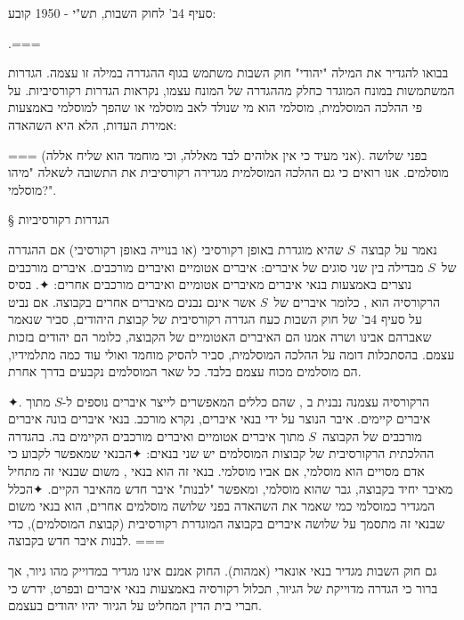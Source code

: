 סעיף 4ב' לחוק השבות, תש"י - 1950 קובע:

.===

בבואו להגדיר את המילה "יהודי" חוק השבות משתמש בגוף ההגדרה במילה זו עצמה.
הגדרות המשתמשות במונח המוגדר כחלק מההגדרה של המונח עצמו, נקראות הגדרות
רקורסיביות. על פי ההלכה המוסלמית, מוסלמי הוא מי שנולד לאב מוסלמי או שהפך
למוסלמי באמצעות אמירת העדות, הלא היא השהאדה:
\begin{Arabic}
\end{Arabic}
===
(אני מעיד כי אין אלוהים לבד מאללה, וכי מוחמד הוא שליח אללה). בפני שלושה
מוסלמים. אנו רואים כי גם ההלכה המוסלמית מגדירה רקורסיבית את התשובה לשאלה "מיהו
מוסלמי?".

§ הגדרות רקורסיביות

נאמר על קבוצה~$S$ שהיא מוגדרת באופן רקורסיבי (או בנוייה באופן רקורסיבי) אם
ההגדרה של~$S$ מבדילה בין שני סוגים של איברים: איברים אטומיים ואיברים מורכבים.
איברים מורכבים נוצרים באמצעות בנאי איברים מאיברים אטומיים ואיברים מורכבים אחרים:
✦. בסיס הרקורסיה הוא ,
כלומר איברים של~$S$ אשר אינם נבנים מאיברים אחרים בקבוצה. אם נביט על סעיף 4ב' של
חוק השבות כעח הגדרה רקורסיבית של קבוצת היהודים, סביר שנאמר שאברהם אבינו ושרה
אמנו הם האיברים האטומיים של הקבוצה, כלומר הם יהודים בזכות עצמם. בהסתכלות דומה
על ההלכה המוסלמית, סביר להסיק מוחמד ואולי עוד כמה מתלמידיו, הם מוסלמים מכוח
עצמם בלבד. כל שאר המוסלמים נקבעים בדרך אחרת.

✦. הרקורסיה עצמנה נבנית ב , שהם כללים
המאפשרים לייצר איברים נוספים ל-$S$ מתוך איברים קיימים. איבר הנוצר על ידי בנאי
איברים, נקרא מורכב. בנאי איברים בונה איברים מורכבים של הקבוצה~$S$ מתוך איברים
אטומיים ואיברים מורכבים הקיימים בה. בהגדרה ההלכתית הרקורסיבית של קבוצות
המוסלמים יש שני בנאים:
✦הבנאי שמאפשר לקבוע כי אדם מסויים הוא מוסלמי, אם אביו מוסלמי. בנאי זה הוא
בנאי , משום שבנאי זה מתחיל מאיבר יחיד בקבוצה, גבר שהוא מוסלמי,
ומאפשר "לבנות" איבר חדש מהאיבר הקיים.
✦הכלל המגדיר כמוסלמי כמי שאמר את השהאדה בפני שלושה מוסלמים אחרים, הוא
בנאי  משום שבנאי זה מתסמך על שלושה איברים בקבוצה המוגדרת רקורסיבית
(קבוצת המוסלמים), כדי לבנות איבר חדש בקבוצה.
===

גם חוק השבות מגדיר בנאי אונארי (אמהות). החוק אמנם אינו מגדיר
במדוייק מהו גיור, אך ברור כי הגדרה מדוייקת של הגיור, תכלול רקורסיה באמצעות בנאי
איברים ובפרט, ידרש כי חברי בית הדין המחליט על הגיור יהיו יהודים בעצמם.

